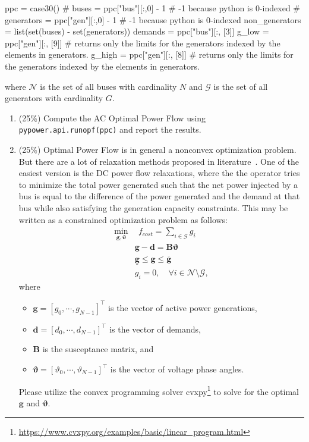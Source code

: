 \documentclass[11pt]{exam}
\begin{document}
\begin{questions}
\begin{parts}
\begin{python}
ppc = case30()
# 
buses = ppc["bus"][:,0] - 1 # -1 because python is 0-indexed
# 
generators = ppc["gen"][:,0] - 1 # -1 because python is 0-indexed
non_generators = list(set(buses) - set(generators))
demands = ppc["bus"][:, [3]]
g_low = ppc["gen"][:, [9]] # returns only the limits for the generators indexed by the elements in generators.
g_high = ppc["gen"][:, [8]] # returns only the limits for the generators indexed by the elements in generators.
\end{python}
where $\mathcal{N}$ is the set of all buses with cardinality $N$ and $\mathcal{G}$ is the set of all generators with cardinality $G$.
\begin{enumerate}[label=\roman*.]
\item (25\%) Compute the AC Optimal Power Flow using \texttt{pypower.api.runopf(ppc)} and report the results.
\item (25\%) Optimal Power Flow is in general a nonconvex optimization problem. But there are a lot of relaxation methods proposed in literature~\cite{low2014convex}. One of the easiest version is the DC power flow relaxations, where the the operator tries to minimize the total power generated such that the net power injected by a bus is equal to the difference of the power generated and the demand at that bus while also satisfying the generation capacity constraints. This may be written as a constrained optimization problem as follows:
\begin{align}
	\min_{\bm{g},\bm{\vartheta}} & ~~f_{cost} = \sum_{i\in \mathcal{G}}   g_{i}\\
	& \bm{g}  - \bm{d} = \bm{B} \bm{\vartheta}\\
	& \underline{\bm{g}} \le \bm{g} \le \overline{\bm{g}}\\
  & g_i = 0, \quad \forall i \in \mathcal{N} \setminus \mathcal{G},
\end{align}
where
\begin{itemize}
  \item $\bm{g} = [{g}_{0}, \cdots, {g}_{N-1}]^\top$ is the vector of active power generations,
  \item $\bm{d} = [{d}_{0}, \cdots, {d}_{N-1}]^\top$ is the vector of demands,
  \item $\bm{B}$ is the susceptance matrix, and
  \item $\bm{\vartheta} = [{\vartheta}_{0}, \cdots, {\vartheta}_{N-1}]^\top$ is the vector of voltage phase angles.
\end{itemize}

Please utilize the convex programming solver cvxpy\footnote{\url{https://www.cvxpy.org/examples/basic/linear_program.html}} to solve for the optimal $\bm{g}$ and $\bm{\vartheta}$.
\end{enumerate}

\end{parts}
\end{questions}



\end{document}
